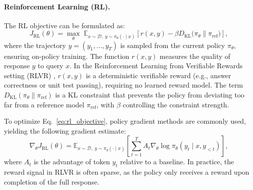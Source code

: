 \documentclass{llmxive}
\begin{document}
\paragraph{Reinforcement Learning (RL).}
The RL objective can be formulated as:
\begin{equation}
J_{\text{RL}}(\theta) = \max_{\theta} \; \mathbb{E}_{x \sim \mathcal{D}, \; y \sim \pi_{\theta}(\cdot \mid x)} \left[ r(x, y) - \beta D_{\text{KL}}\bigl(\pi_{\theta} \parallel \pi_{\text{ref}}\bigr) \right],
\label{eq:rl_objective}
\end{equation}
where the trajectory $y = (y_1, \ldots, y_T)$ is sampled from the current policy $\pi_{\theta}$, ensuring on-policy training. The function $r(x, y)$ measures the quality of response $y$ to query $x$. In the Reinforcement Learning from Verifiable Rewards setting (RLVR) \citep{Venkatkrishna2026AletheiaWM}, $r(x, y)$ is a deterministic verifiable reward (e.g., answer correctness or unit test passing), requiring no learned reward model. The term $D_{\text{KL}}(\pi_{\theta} \parallel \pi_{\text{ref}})$ is a KL constraint that prevents the policy from deviating too far from a reference model $\pi_{\text{ref}}$, with $\beta$ controlling the constraint strength.

To optimize Eq.~\eqref{eq:rl_objective}, policy gradient methods are commonly used, yielding the following gradient estimate:
\begin{equation}
\nabla_{\theta} J_{\text{RL}}(\theta) = \mathbb{E}_{x \sim \mathcal{D}, \; y \sim \pi_{\theta}(\cdot \mid x)} \left[ \sum_{t=1}^{T} A_t \nabla_{\theta} \log \pi_{\theta}(y_t \mid x, y_{<t}) \right],
\label{eq:rl_gradient}
\end{equation}
where $A_t$ is the advantage of token $y_t$ relative to a baseline. In practice, the reward signal in RLVR is often sparse, as the policy only receives a reward upon completion of the full response.
\end{document}
